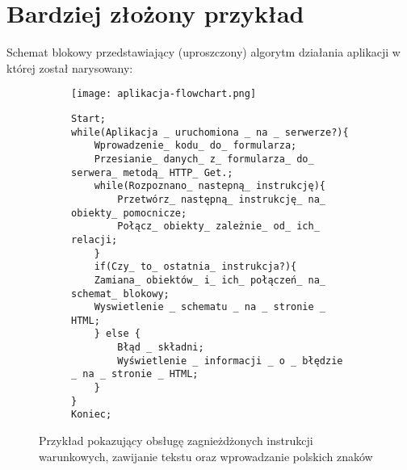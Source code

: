 \section{Bardziej złożony przykład}
Schemat blokowy przedstawiający (uproszczony) algorytm działania aplikacji w której został narysowany: {\smallskip}

			\begin{figure}[H]
  \begin{subfigure}{\textwidth}
    \texttt{[image: aplikacja-flowchart.png]}
  \end{subfigure}\hfill
  \begin{subfigure}[t]{0.44\textwidth}
    \begin{verbatim}
Start;
while(Aplikacja _ uruchomiona _ na _ serwerze?){
    Wprowadzenie_ kodu_ do_ formularza;
    Przesianie_ danych_ z_ formularza_ do_ serwera_ metodą_ HTTP_ Get.;
    while(Rozpoznano_ nastepną_ instrukcję){
        Przetwórz_ następną_ instrukcję_ na_ obiekty_ pomocnicze;
        Połącz_ obiekty_ zależnie_ od_ ich_ relacji;
    }
    if(Czy_ to_ ostatnia_ instrukcja?){
    Zamiana_ obiektów_ i_ ich_ połączeń_ na_ schemat_ blokowy;
    Wyswietlenie _ schematu _ na _ stronie _ HTML;
    } else {
        Błąd _ składni;
        Wyświetlenie _ informacji _ o _ błędzie _ na _ stronie _ HTML;
    }
}
Koniec;
    \end{verbatim}
  \end{subfigure}%
  \caption{Przykład pokazujący obsługę zagnieżdżonych instrukcji warunkowych, zawijanie tekstu oraz wprowadzanie polskich znaków}
\end{figure}